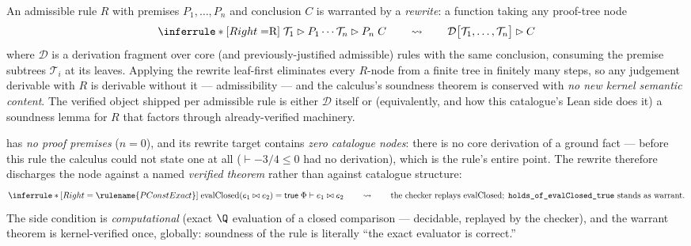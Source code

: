

\begin{brecipe}\label{rec:pce-template}
An admissible rule $R$ with premises $P_1, \dots, P_n$ and conclusion $C$
is warranted by a \emph{rewrite}: a function taking any proof-tree node
\[
\inferrule*[Right=$R$]{\;\mathcal{T}_1 \rhd P_1 \\ \cdots \\ \mathcal{T}_n \rhd P_n\;}{C}
\qquad\rightsquigarrow\qquad
\mathcal{D}\bigl[\mathcal{T}_1, \dots, \mathcal{T}_n\bigr] \rhd C
\]
where $\mathcal{D}$ is a derivation fragment over core (and
previously-justified admissible) rules with the same conclusion, consuming
the premise subtrees $\mathcal{T}_i$ at its leaves. Applying the rewrite
leaf-first eliminates every $R$-node from a finite tree in finitely many
steps, so any judgement derivable with $R$ is derivable without it ---
admissibility --- and the calculus's soundness theorem is conserved with
\emph{no new kernel semantic content}. The verified object shipped per
admissible rule is either $\mathcal{D}$ itself or (equivalently, and how
this catalogue's Lean side does it) a soundness lemma for $R$ that factors
through already-verified machinery.
\end{brecipe}

\begin{brecipe}
\label{rec:pce-instance}
 has \emph{no proof premises} ($n = 0$), and its
rewrite target contains \emph{zero catalogue nodes}: there is no core
derivation of a ground fact --- before this rule the calculus could not
state one at all ($\vdash -3/4 \leq 0$ had no derivation), which is the
rule's entire point. The rewrite therefore discharges the node against a
named \emph{verified theorem} rather than against catalogue structure:
\[
\inferrule*[Right=\rulename{PConstExact}]{\;\mathrm{evalClosed}(e_1 \bowtie e_2) = \mathsf{true}\;}{\Phi \vdash e_1 \bowtie e_2}
\qquad\rightsquigarrow\qquad
\text{\upshape the checker replays } \mathrm{evalClosed};\;
\text{\texttt{holds\_of\_evalClosed\_true} stands as warrant.}
\]
The side condition is \emph{computational} (exact $\Q$ evaluation of a
closed comparison --- decidable, replayed by the checker), and the warrant
theorem is kernel-verified once, globally: soundness of the rule is
literally ``the exact evaluator is correct.''
\end{brecipe}

